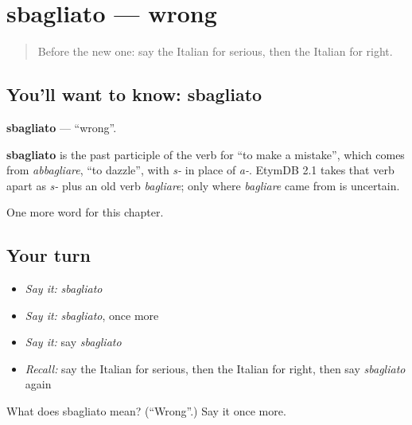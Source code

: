 \section[sbagliato]{sbagliato — wrong}

\label{lesson:IT-C127-sbagliato}



\begin{quote}
Before the new one: say the Italian for serious, then the Italian for right.
\end{quote}

\subsection*{You'll want to know: sbagliato}
\textbf{sbagliato} — \textquotedblleft{}wrong\textquotedblright{}.

\begin{cousinweb}
\textbf{sbagliato} is the past participle of the verb for \textquotedblleft{}to make a mistake\textquotedblright{}, which comes from \emph{abbagliare}, \textquotedblleft{}to dazzle\textquotedblright{}, with \emph{s-} in place of \emph{a-}. EtymDB 2.1 takes that verb apart as \emph{s-} plus an old verb \emph{bagliare}; only where \emph{bagliare} came from is uncertain.
\end{cousinweb}

\begin{grammarlens}[title={What you've built}]
One more word for this chapter.
\end{grammarlens}

\subsection*{Your turn}
\begin{itemize}
\raggedright
  \item \emph{Say it:} \emph{sbagliato}
  \item \emph{Say it:} \emph{sbagliato}, once more
  \item \emph{Say it:} say \emph{sbagliato}
  \item \emph{Recall:} say the Italian for serious, then the Italian for right, then say \emph{sbagliato} again
\end{itemize}

\begin{tcolorbox}[breakable,colback=teal!4,colframe=teal!35!black,title={Before you move on}]
What does sbagliato mean? (\textquotedblleft{}Wrong\textquotedblright{}.) Say it once more.
\end{tcolorbox}
